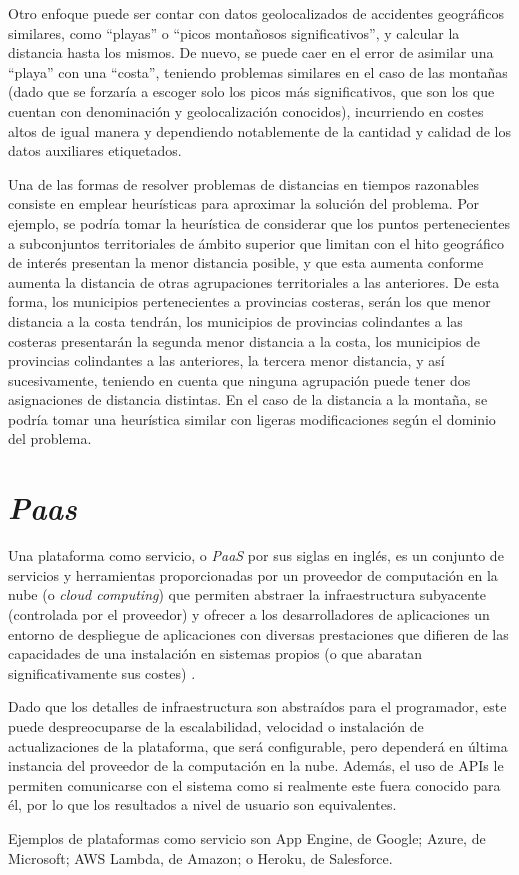 Otro enfoque puede ser contar con datos geolocalizados de accidentes geográficos similares, como ``playas'' o ``picos montañosos significativos'', y calcular la distancia hasta los mismos. De nuevo, se puede caer en el error de asimilar una ``playa'' con una ``costa'', teniendo problemas similares en el caso de las montañas (dado que se forzaría a escoger solo los picos más significativos, que son los que cuentan con denominación y geolocalización conocidos), incurriendo en costes altos de igual manera y dependiendo notablemente de la cantidad y calidad de los datos auxiliares etiquetados.

Una de las formas de resolver problemas de distancias en tiempos razonables consiste en emplear heurísticas para aproximar la solución del problema. Por ejemplo, se podría tomar la heurística de considerar que los puntos pertenecientes a subconjuntos territoriales de ámbito superior que limitan con el hito geográfico de interés presentan la menor distancia posible, y que esta aumenta conforme aumenta la distancia de otras agrupaciones territoriales a las anteriores. De esta forma, los municipios pertenecientes a provincias costeras, serán los que menor distancia a la costa tendrán, los municipios de provincias colindantes a las costeras presentarán la segunda menor distancia a la costa, los municipios de provincias colindantes a las anteriores, la tercera menor distancia, y así sucesivamente, teniendo en cuenta que ninguna agrupación puede tener dos asignaciones de distancia distintas. En el caso de la distancia a la montaña, se podría tomar una heurística similar con ligeras modificaciones según el dominio del problema.

\section{\textit{Paas}}

Una plataforma como servicio, o \textit{PaaS} por sus siglas en inglés, es un conjunto de servicios y herramientas proporcionadas por un proveedor de computación en la nube (o \textit{cloud computing}) que permiten abstraer la infraestructura subyacente (controlada por el proveedor) y ofrecer a los desarrolladores de aplicaciones un entorno de despliegue de aplicaciones con diversas prestaciones que difieren de las capacidades de una instalación en sistemas propios (o que abaratan significativamente sus costes) \cite{paas}.

Dado que los detalles de infraestructura son abstraídos para el programador, este puede despreocuparse de la escalabilidad, velocidad o instalación de actualizaciones de la plataforma, que será configurable, pero dependerá en última instancia del proveedor de la computación en la nube. Además, el uso de APIs le permiten comunicarse con el sistema como si realmente este fuera conocido para él, por lo que los resultados a nivel de usuario son equivalentes.

Ejemplos de plataformas como servicio son App Engine, de Google; Azure, de Microsoft; AWS Lambda, de Amazon; o Heroku, de Salesforce.